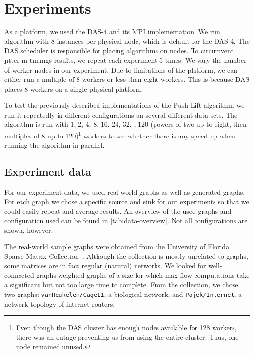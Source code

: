 \chapter{Experiments}
\label{chp:experiments}

As a platform, we used the DAS-4 and its MPI implementation. We run algorithm with 8 instances per physical node, which is default for the DAS-4.
The DAS scheduler is responsible for placing algorithms on nodes. To circumvent jitter in timings results, we repeat each experiment 5 times. We vary the number of worker nodes in our experiment. Due to limitations of the platform, we can either run a multiple of 8 workers or less than eight workers. This is because DAS places 8 workers on a single physical platform.

To test the previously described implementations of the Push Lift algorithm, we run it repeatedly in different configurations on several different data sets. The algorithm is run with 1, 2, 4, 8, 16, 24, 32, \textellipsis, 120 (powers of two up to eight, then multiples of 8 up to 120)\footnote{Even though the DAS cluster has enough nodes available for 128 workers, there was an outage preventing us from using the entire cluster. Thus, one node remained unused.} workers to see whether there is any speed up when running the algorithm in parallel.

\section{Experiment data}
For our experiment data, we used real-world graphs as well as generated graphs. For each graph we chose a specific source and sink for our experiments so that we could easily repeat and average results. An overview of the used graphs and configuration used can be found in \autoref{tab:data-overview}. Not all configurations are shown, however.

The real-world sample graphs were obtained from the University of Florida Sparse Matrix Collection~\cite{FloridaSparseMatrix}. Although the collection is mostly unrelated to graphs, some matrices are in fact regular (natural) networks. We looked for well-connected graphs weighted graphs of a size for which max-flow computations take a significant but not too large time to complete. From the collection, we chose two graphs: \texttt{vanHeukelem/Cage11}, a biological network, and \texttt{Pajek/Internet}, a network topology of internet routers.

